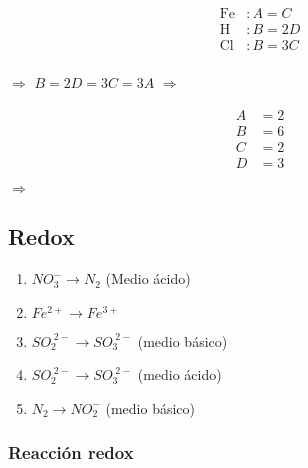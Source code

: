 \begin{minipage}[l]{0.2\textwidth}
\begin{align*}
\text{Fe}&: A = C\\
\text{H}&: B = 2D\\
\text{Cl}&: B = 3C\\
\;
\end{align*}
\end{minipage}
$\Longrightarrow$
\hfil
$B=2D=3C=3A$
\hfil
$\Longrightarrow$
\begin{minipage}[l]{0.1\textwidth}
\begin{align*}
A&= 2\\
B&= 6\\
C&= 2\\
D&= 3
\end{align*}
\end{minipage}
$\Longrightarrow$
\hfil 
{}
\hfil


\subsection{Redox}

\begin{enumerate}
    \item $NO_3^- \rightarrow N_2$ (Medio ácido)
    \item $Fe^{2+} \rightarrow Fe^{3+}$
    \item $SO_2^{\;2-} \rightarrow SO_3^{\;2-}$ (medio básico)
    \item $SO_2^{\;2-} \rightarrow SO_3^{\;2-}$ (medio ácido)
    \item $N_2 \rightarrow NO_2^-$ (medio básico)
\end{enumerate}


\subsubsection*{Reacción redox}


